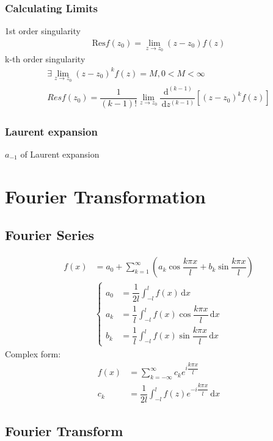 \documentclass[10pt, a4paper]{article}
\def\d{\,\mathrm{d}}
\def\Res{\mathrm{Res}}
\begin{document}
\begin{multicols}{2}
		\subsubsection{Calculating Limits}
		1st order singularity
		\begin{align}
			\Res f(z_0) = \lim\limits_{z\rightarrow z_0}(z-z_0)f(z)
		\end{align}
		k-th order singularity
		\begin{align}
			\exists \lim\limits_{z\rightarrow z_0}(z-z_0)^k f(z) = M, 0<M<\infty\\
			Res f(z_0) = \dfrac{1}{(k-1)!}\lim\limits_{z \rightarrow z_0}\dfrac{\d^{(k-1)} }{\d z^{(k-1)}}\left[(z-z_0)^kf(z)\right]
		\end{align}
		\subsubsection{Laurent expansion}
		$a_{-1}$ of Laurent expansion
	
\section{Fourier Transformation}

	\subsection{Fourier Series}
	\begin{align}
		f(x) &= a_0 + \sum_{k=1}^{\infty}(a_k\cos{\dfrac{k\pi x}{l}} + b_k\sin{\dfrac{k\pi x}{l}})\\
		&\left\{\begin{aligned}
			a_0 &= \dfrac{1}{2l}\int_{-l}^{l}f(x)\d x\\
			a_k &= \dfrac{1}{l}\int_{-l}^{l}f(x)\cos{\dfrac{k\pi x}{l}}\d x\\
			b_k &= \dfrac{1}{l}\int_{-l}^{l}f(x)\sin{\dfrac{k\pi x}{l}}\d x
		\end{aligned}\right.
	\end{align}
	Complex form:
	\begin{align}
		f(x) &= \sum_{k=-\infty}^{\infty}c_ke^{i\dfrac{k\pi x}{l}}\\
		c_k &= \dfrac{1}{2l}\int_{-l}^{l}f(z)e^{-i\dfrac{k\pi x}{l}}\d x
	\end{align}

	\subsection{Fourier Transform}
	

\end{multicols}
\end{document}
